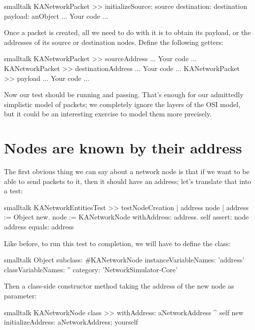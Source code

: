\documentclass[10pt,twoside,english]{_support/latex/sbabook/sbabook}
\begin{document}
\begin{displaycode}{smalltalk}
KANetworkPacket >> initializeSource: source destination: destination payload: anObject
    ... Your code ...
\end{displaycode}

Once a packet is created, all we need to do with it is to obtain its payload, or the addresses of its source or destination nodes.
Define the following getters:

\begin{displaycode}{smalltalk}
KANetworkPacket >> sourceAddress
	... Your code ...
KANetworkPacket >> destinationAddress
	... Your code ...
KANetworkPacket >> payload
	... Your code ...
\end{displaycode}

Now our test should be running and passing.
That's enough for our admittedly simplistic model of packets; we completely ignore the layers of the OSI model, but it could be an interesting exercise to model them more precisely.
\section{Nodes are known by their address}
The first obvious thing we can say about a network node is that if we want to be able to send packets to it, then it should have an address; let's translate that into a test:

\begin{displaycode}{smalltalk}
KANetworkEntitiesTest >> testNodeCreation
    | address node |
    address := Object new.
    node := KANetworkNode withAddress: address.
    self assert: node address equals: address
\end{displaycode}

Like before, to run this test to completion, we will have to define the  class:

\begin{displaycode}{smalltalk}
Object subclass: #KANetworkNode
    instanceVariableNames: 'address'
    classVariableNames: ''
    category: 'NetworkSimulator-Core'
\end{displaycode}

Then a class-side constructor method taking the address of the new node as parameter:

\begin{displaycode}{smalltalk}
KANetworkNode class >> withAddress: aNetworkAddress
    ^ self new
        initializeAddress: aNetworkAddress;
        yourself
\end{displaycode}
\end{document}
